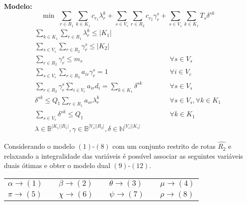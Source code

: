 \documentclass[12pt]{article}
\begin{document}
\noindent\textbf{Modelo:}
\vspace{5mm}
$$\min \,\, \sum\limits_{r \in R_1} {\sum\limits_{k \in K_1}{c_{r_1} \lambda^k_r}} + \sum\limits_{s \in V_s} {\sum\limits_{r \in R_2}{c_{r_2} \gamma^s_r}} + \sum\limits_{s \in V_s} { \sum\limits_{k \in K_1} T_s \delta^{sk} }$$
\begin{eqnarray}
\label{primal01}
  \sum\limits_{ k \in K_1 } { \sum\limits_{ r \in R_1 } { \lambda^k_r } } \le |K_1| \\
\label{primal02}
  \sum\limits_{ s \in V_s } { \sum\limits_{ r \in R_2 } { \gamma^s_r } } \le |K_2| \\
\label{primal03}
  \sum\limits_{ r \in R_2 } { \gamma^s_r } \le m_s & \hspace{1cm} & \forall s \in V_s \\
\label{primal04}
  \sum\limits_{ s \in V_s } { \sum\limits_{ r \in R_2 } { a_{ir} \gamma^s_r } } = 1 & \hspace{1cm} & \forall i \in V_c \\
\label{primal05}
  \sum\limits_{ r \in R_2 } { \gamma^s_r \sum\limits_{ i \in V_c }{ a_{ir} d_i } } = \sum\limits_{ k \in K_1 } { \delta^{sk} } & \hspace{1cm} & \forall s \in V_s \\
\label{primal06}
  \delta^{sk} \le Q_1 \sum\limits_{ r \in R_1 } { a_{sr} \lambda^k_r } & \hspace{1cm} & \forall s \in V_s, \forall k \in K_1 \\
\label{primal07}
  \sum\limits_{ s \in V_s } { \delta^{sk} } \le Q_1 & \hspace{1cm} & \forall k \in K_1 \\
\label{primal08}
  \lambda \in \mathbb{B}^{|K_1||R_1|}, \gamma \in \mathbb{B}^{|V_s||R_2|}, \delta \in \mathbb{N}^{|V_s||K_1|}
\end{eqnarray}

\newpage
Considerando o modelo $(1)$-$(8)$ com um conjunto restrito de rotas $\hat{R_2}$ e relaxando a integralidade das vari\'aveis \'e poss\'ivel associar as seguintes vari\'aveis duais \'otimas e obter o modelo dual $(9)$-$(12)$.

\begin{center}
\begin{tabular}{lllllll}
$\alpha \rightarrow (1)$ & & $\beta \rightarrow (2)$ & & $\theta \rightarrow (3)$ & & $\mu \rightarrow (4)$ \\
$\pi \rightarrow (5)$ & & $\chi \rightarrow (6)$ & & $\psi \rightarrow (7)$ & & $\rho \rightarrow (8)$
\end{tabular}
\end{center}
\end{document}

